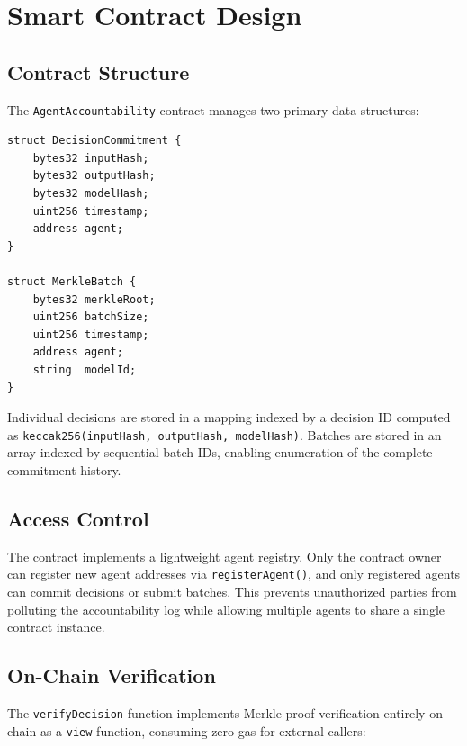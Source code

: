 \documentclass[manuscript,nonacm]{acmart}
\begin{document}
\section{Smart Contract Design}
\label{sec:contract}

\subsection{Contract Structure}

The \texttt{AgentAccountability} contract manages two primary data structures:

\begin{lstlisting}[caption={Core data structures},label={lst:structs}]
struct DecisionCommitment {
    bytes32 inputHash;
    bytes32 outputHash;
    bytes32 modelHash;
    uint256 timestamp;
    address agent;
}

struct MerkleBatch {
    bytes32 merkleRoot;
    uint256 batchSize;
    uint256 timestamp;
    address agent;
    string  modelId;
}
\end{lstlisting}

Individual decisions are stored in a mapping indexed by a decision ID computed as \texttt{keccak256(inputHash, outputHash, modelHash)}.
Batches are stored in an array indexed by sequential batch IDs, enabling enumeration of the complete commitment history.

\subsection{Access Control}

The contract implements a lightweight agent registry.
Only the contract owner can register new agent addresses via \texttt{registerAgent()}, and only registered agents can commit decisions or submit batches.
This prevents unauthorized parties from polluting the accountability log while allowing multiple agents to share a single contract instance.

\subsection{On-Chain Verification}

The \texttt{verifyDecision} function implements Merkle proof verification entirely on-chain as a \texttt{view} function, consuming zero gas for external callers:
\end{document}
